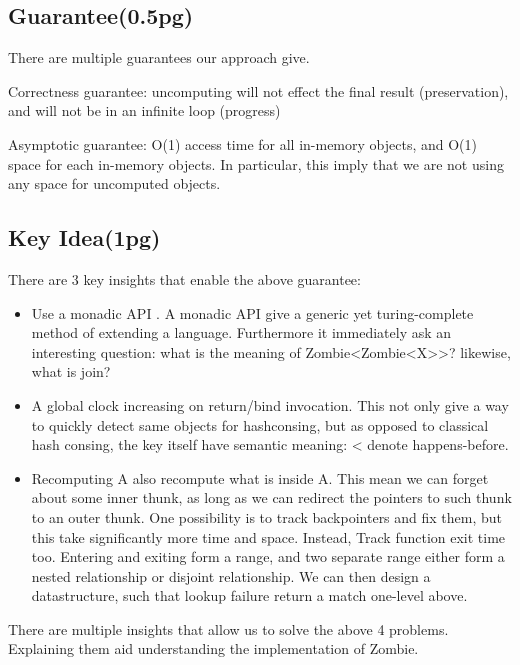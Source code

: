 \subsection{Guarantee(0.5pg)}
There are multiple guarantees our approach give.

Correctness guarantee: uncomputing will not effect the final result (preservation), and will not be in an infinite loop (progress)

Asymptotic guarantee: O(1) access time for all in-memory objects, and O(1) space for each in-memory objects. In particular, this imply that we are not using any space for uncomputed objects.

\subsection{Key Idea(1pg)}
There are 3 key insights that enable the above guarantee:
\begin{itemize}
	\item Use a monadic API . A monadic API give a generic yet turing-complete  method of extending a language. Furthermore it immediately ask an interesting question: what is the meaning of Zombie<Zombie<X>>? likewise, what is join?
	\item A global clock increasing on return/bind invocation. This not only give a way to quickly detect same objects for hashconsing, but as opposed to classical hash consing, the key itself have semantic meaning: < denote happens-before.
	\item Recomputing A also recompute what is inside A. This mean we can forget about some inner thunk, as long as we can redirect the pointers to such thunk to an outer thunk. One possibility is to track backpointers and fix them, but this take significantly more time and space. Instead, Track function exit time too. Entering and exiting form a range, and two separate range either form a nested relationship or disjoint relationship. We can then design a datastructure, such that lookup failure return a match one-level above.
\end{itemize}


There are multiple insights that allow us to solve the above 4 problems. Explaining them aid understanding the implementation of Zombie.

